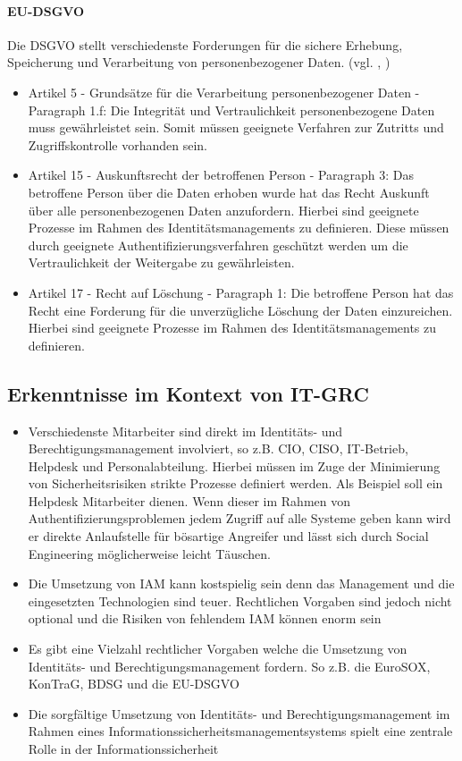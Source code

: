 \documentclass[11pt]{article}
\begin{document}
\paragraph{EU-DSGVO}
Die DSGVO stellt verschiedenste Forderungen für die sichere Erhebung, Speicherung und Verarbeitung von personenbezogener Daten. (vgl. \cite{Hindle_2020}, \cite{eu2016})
\begin{itemize}
  \item Artikel 5 - Grundsätze für die Verarbeitung personenbezogener Daten - Paragraph 1.f: Die Integrität und Vertraulichkeit personenbezogene Daten muss gewährleistet sein. Somit müssen geeignete Verfahren zur Zutritts und Zugriffskontrolle vorhanden sein.
  \item Artikel 15 - Auskunftsrecht der betroffenen Person - Paragraph 3: Das betroffene Person über die Daten erhoben wurde hat das Recht Auskunft über alle personenbezogenen Daten anzufordern. Hierbei sind geeignete Prozesse im Rahmen des Identitätsmanagements zu definieren. Diese müssen durch geeignete Authentifizierungsverfahren geschützt werden um die Vertraulichkeit der Weitergabe zu gewährleisten.
  \item Artikel 17 - Recht auf Löschung - Paragraph 1: Die betroffene Person hat das Recht eine Forderung für die unverzügliche Löschung der Daten einzureichen. Hierbei sind geeignete Prozesse im Rahmen des Identitätsmanagements zu definieren.
\end{itemize}
\subsection{Erkenntnisse im Kontext von IT-GRC}
\begin{itemize}
  \item Verschiedenste Mitarbeiter sind direkt im Identitäts- und Berechtigungsmanagement involviert, so z.B. CIO, CISO, IT-Betrieb, Helpdesk und Personalabteilung. Hierbei müssen im Zuge der Minimierung von Sicherheitsrisiken strikte Prozesse definiert werden. Als Beispiel soll ein Helpdesk Mitarbeiter dienen. Wenn dieser im Rahmen von Authentifizierungsproblemen jedem Zugriff auf alle Systeme geben kann wird er direkte Anlaufstelle für bösartige Angreifer und lässt sich durch Social Engineering möglicherweise leicht Täuschen.
  \item Die Umsetzung von IAM kann kostspielig sein denn das Management und die eingesetzten Technologien sind teuer. Rechtlichen Vorgaben sind jedoch nicht optional und die Risiken von fehlendem IAM können enorm sein
  \item Es gibt eine Vielzahl rechtlicher Vorgaben welche die Umsetzung von Identitäts- und Berechtigungsmanagement fordern. So z.B. die EuroSOX, KonTraG, BDSG und die EU-DSGVO
  \item Die sorgfältige Umsetzung von Identitäts- und Berechtigungsmanagement im Rahmen eines Informationssicherheitsmanagementsystems spielt eine zentrale Rolle in der Informationssicherheit
\end{itemize}
\end{document}
